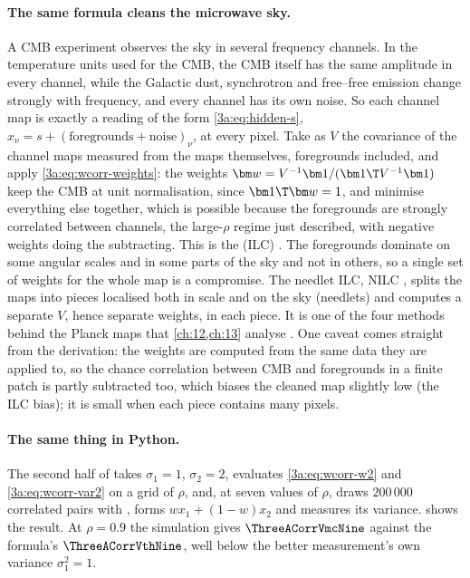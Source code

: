 \paragraph{The same formula cleans the microwave sky.}
A CMB experiment observes the sky in several frequency channels. In the
temperature units used for the CMB, the CMB itself has the same amplitude in
every channel, while the Galactic dust, synchrotron and free--free emission
change strongly with frequency, and every channel has its own noise. So each
channel map is exactly a reading of the form \eqref{3a:eq:hidden-s},
$x_\nu=s+(\text{foregrounds}+\text{noise})_\nu$, at every pixel. Take as
$V$ the covariance of the channel maps measured from the maps themselves,
foregrounds included, and apply \eqref{3a:eq:wcorr-weights}: the weights
$\bm w=V^{-1}\bm1/(\bm1\T V^{-1}\bm1)$ keep the CMB at unit normalisation,
since $\bm1\T\bm w=1$, and minimise everything else together, which is
possible because the foregrounds are strongly correlated between channels,
the large-$\rho$ regime just described, with negative weights doing the
subtracting. This is the  (ILC)
\cite{Tegmark2003ILC}. The foregrounds dominate on some angular scales and in
some parts of the sky and not in others, so a single set of weights for the
whole map is a compromise. The needlet ILC, NILC \cite{Delabrouille2009NILC},
splits the maps into pieces localised both in scale and on the sky (needlets)
and computes a separate $V$, hence separate weights, in each piece. It is one
of the four methods behind the Planck maps that \cref{ch:12,ch:13} analyse
\cite{Planck2018IV}. One caveat comes straight from the derivation: the
weights are computed from the same data they are applied to, so the chance
correlation between CMB and foregrounds in a finite patch is partly
subtracted too, which biases the cleaned map slightly low (the ILC bias);
it is small when each piece contains many pixels.

\paragraph{The same thing in Python.}
The second half of  takes $\sigma_1=1$,
$\sigma_2=2$, evaluates \eqref{3a:eq:wcorr-w2} and \eqref{3a:eq:wcorr-var2}
on a grid of $\rho$, and, at seven values of $\rho$, draws $200\,000$
correlated pairs with , forms
$wx_1+(1-w)x_2$ and measures its variance. 
shows the result. At $\rho=0.9$ the simulation gives $\ThreeACorrVmcNine$
against the formula's $\ThreeACorrVthNine$, well below the better
measurement's own variance $\sigma_1^2=1$.

